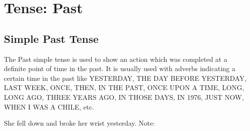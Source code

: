 \section{Tense: Past}
\subsection{Simple Past Tense}
The Past simple tense is used to show an action which was completed at a
definite point of time in the past.
It is usually used with adverbs indicating a certain time in the past like
YESTERDAY, THE DAY BEFORE YESTERDAY, LAST WEEK, ONCE, THEN, IN THE PAST, ONCE
UPON A TIME, LONG, LONG AGO, THREE YEARS AGO, IN THOSE DAYS, IN 1976, JUST NOW,
WHEN I WAS A CHILE, etc.

She fell down and broke her wrist yesterday.
\newline
\newline
Note:
